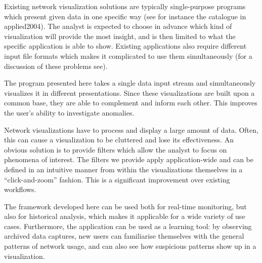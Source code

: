 Existing network visualization solutions are typically single-purpose programs which present given data in one specific way (see for instance the catalogue in  applied2004). The analyst is expected to choose in advance which kind of visualization will provide the most insight, and is then limited to what the specific application is able to show. Existing applications also require different input file formats which makes it complicated to use them simultaneously (for a discussion of these problems see). 

The program presented here takes a single data input stream and simultaneously visualizes it in different presentations. Since these visualizations are built upon a common base, they are able to complement and inform each other. This improves the user's ability to investigate anomalies.

Network visualizations have to process and display a large amount of data. Often, this can cause a visualization to be cluttered and lose its effectiveness. An obvious solution is to provide filters which allow the analyst to focus on phenomena of interest. The filters we provide apply application-wide and can be defined in an intuitive manner from within the visualizations themselves in a ``click-and-zoom'' fashion. This is a significant improvement over existing workflows.

The framework developed here can be used both for real-time monitoring, but also for historical analysis, which makes it applicable for a wide variety of use cases. Furthermore, the application can be used as a learning tool: by observing archived data captures, new users can familiarise themselves with the general patterns of network usage, and can also see how suspicious patterns show up in a visualization.